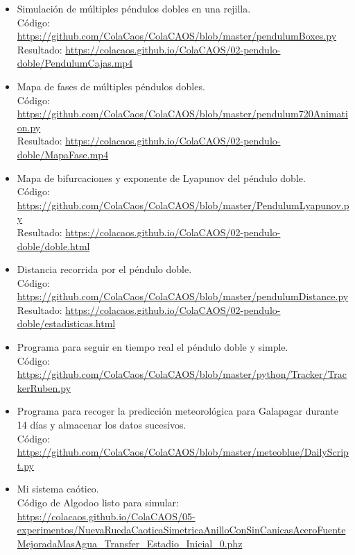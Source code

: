 \documentclass[
  10pt,
  a4paper,
  DIV=11,
  numbers=noendperiod,
  open=any]{scrreprt}
\numberwithin{equation}{chapter}
\numberwithin{equation}{section}
\renewcommand{\[}{\begin{equation}}
\renewcommand{\]}{\end{equation}}
\begin{document}
\begin{itemize}
\item
  Simulación de múltiples péndulos dobles en una rejilla.\\
  Código: \url{https://github.com/ColaCaos/ColaCAOS/blob/master/pendulumBoxes.py}\\
  Resultado: \url{https://colacaos.github.io/ColaCAOS/02-pendulo-doble/PendulumCajas.mp4}

\item
  Mapa de fases de múltiples péndulos dobles.\\
  Código: \url{https://github.com/ColaCaos/ColaCAOS/blob/master/pendulum720Animation.py}\\
  Resultado: \url{https://colacaos.github.io/ColaCAOS/02-pendulo-doble/MapaFase.mp4}

\item
  Mapa de bifurcaciones y exponente de Lyapunov del péndulo doble.\\
  Código: \url{https://github.com/ColaCaos/ColaCAOS/blob/master/PendulumLyapunov.py}\\
  Resultado: \url{https://colacaos.github.io/ColaCAOS/02-pendulo-doble/doble.html}

\item
  Distancia recorrida por el péndulo doble.\\
  Código: \url{https://github.com/ColaCaos/ColaCAOS/blob/master/pendulumDistance.py}\\
  Resultado: \url{https://colacaos.github.io/ColaCAOS/02-pendulo-doble/estadisticas.html}

\item
  Programa para seguir en tiempo real el péndulo doble y simple.\\
  Código: \url{https://github.com/ColaCaos/ColaCAOS/blob/master/python/Tracker/TrackerRuben.py}

\item
  Programa para recoger la predicción meteorológica para Galapagar durante 14 días y almacenar los datos sucesivos.\\
  Código: \url{https://github.com/ColaCaos/ColaCAOS/blob/master/meteoblue/DailyScript.py}

\item
  Mi sistema caótico.\\
  Código de Algodoo listo para simular: \url{https://colacaos.github.io/ColaCAOS/05-experimentos/NuevaRuedaCaoticaSimetricaAnilloConSinCanicasAceroFuenteMejoradaMasAgua_Transfer_Estadio_Inicial_0.phz}
\end{itemize}
\end{document}
